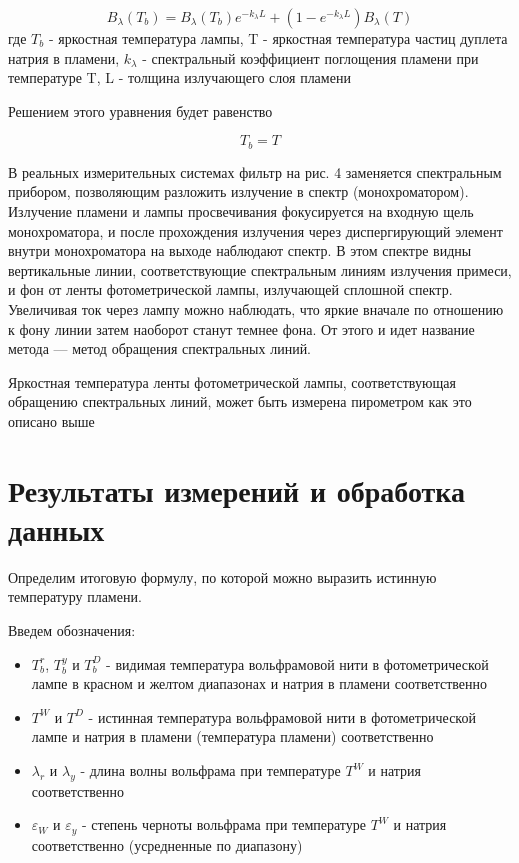 \documentclass[12pt,a4paper]{article}
\begin{document}
\begin{equation}
B_{\lambda}(T_b) = B_{\lambda}(T_b)e^{-k_{\lambda}L} + (1 - e^{-k_{\lambda}L})B_{\lambda}(T)
\end{equation}
где $T_b$ - яркостная температура лампы, T - яркостная температура частиц дуплета натрия в пламени, $k_{\lambda}$ - спектральный коэффициент поглощения пламени при температуре T, L - толщина излучающего слоя пламени

\par Решением этого уравнения будет равенство

\begin{equation}
T_b = T
\end{equation}

\par В реальных измерительных системах фильтр на рис. 4 заменяется спектральным прибором, позволяющим разложить излучение в спектр (монохроматором). Излучение пламени и лампы просвечивания фокусируется на входную щель монохроматора, и после прохождения излучения через диспергирующий элемент внутри монохроматора на выходе наблюдают спектр. В этом спектре видны вертикальные линии, соответствующие спектральным линиям излучения примеси, и фон от ленты фотометрической лампы, излучающей сплошной спектр. Увеличивая ток через лампу можно наблюдать, что яркие вначале по отношению к фону линии затем наоборот станут темнее фона. От этого и идет название метода — метод обращения спектральных линий.
\par Яркостная температура ленты фотометрической лампы, соответствующая обращению спектральных линий, может быть измерена пирометром как это описано выше

\section{Результаты измерений и обработка данных}

\par Определим итоговую формулу, по которой можно выразить истинную температуру пламени.
\par Введем обозначения:
\begin{itemize}
\item $T_b^{r}$, $T_b^{y}$ и $T_b^{D}$ - видимая температура вольфрамовой нити в фотометрической лампе в красном и желтом диапазонах и натрия в пламени соответственно
\item $T^W$ и $T^{D}$ - истинная температура вольфрамовой нити в фотометрической лампе и натрия в пламени (температура пламени) соответственно
\item $\lambda_{r}$ и $\lambda_{y}$ - длина волны вольфрама при температуре $T^W$ и натрия соответственно
\item $\varepsilon_{W}$ и $\varepsilon_{y}$ - степень черноты вольфрама при температуре $T^W$ и натрия соответственно (усредненные по диапазону)

\end{itemize}
\end{document}
